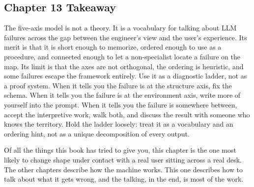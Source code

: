 \subsection{Chapter 13 Takeaway}

The five-axis model is not a theory. It is a vocabulary for
talking about LLM failures across the gap between the engineer's
view and the user's experience. Its merit is that it is short
enough to memorize, ordered enough to use as a procedure, and
connected enough to let a non-specialist locate a failure on the
map. Its limit is that the axes are not orthogonal, the ordering
is heuristic, and some failures escape the framework entirely. Use
it as a diagnostic ladder, not as a proof system. When it tells
you the failure is at the structure axis, fix the schema. When it
tells you the failure is at the environment axis, write more of
yourself into the prompt. When it tells you the failure is
somewhere between, accept the interpretive work, walk both, and
discuss the result with someone who knows the territory. Hold the
ladder loosely: treat it as a vocabulary and an ordering hint,
not as a unique decomposition of every output.

Of all the things this book has tried to give you, this chapter is
the one most likely to change shape under contact with a real user
sitting across a real desk. The other chapters describe how the
machine works. This one describes how to talk about what it gets
wrong, and the talking, in the end, is most of the work.

